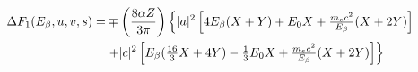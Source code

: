 %
%
%
\begin{align}
\Delta F_1(E_{\beta}, u, v, s) = &
\mp \left( \frac{8 \alpha Z}{3\pi } \right) \left\{ |a|^2 \left[ 4 E_{\beta} (X+Y) + E_0 X + \textstyle{\frac{m_ec^2}{E_{\beta}}}(X+2Y) \right] 
\right. \nonumber \\ & \left.
+ |c|^2\left[ E_{\beta} ( \textstyle{\frac{16}{3}} X + 4 Y)  - \textstyle{\frac{1}{3}}E_0 X + \textstyle{\frac{m_ec^2}{E_{\beta}}} (X+2Y) \right]
\right\}
\label{eq:holstein_DeltaF1_Euvs}
\end{align}
% 
% 
% 
